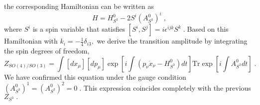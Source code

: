 \documentclass[12pt,a4paper]{article}
\begin{document}
the corresponding Hamiltonian can be written as%
\begin{equation}
H=H_{S^{3}}^{0}-2S^{i}(A_{S^{3}}^{0})^{i}\;,
\end{equation}
where $S^{i}$ is a spin variable that satisfies $[S^{i},S^{j}]=i\epsilon
^{ijk}S^{k}\;.\;$Based on this Hamiltonian with $k_{i}=-\frac{1}{4}\delta
_{i3},$ we derive the transition amplitude by integrating the spin degrees
of freedom\cite{Nielsen:1988sa}\cite{Kashiwa:1990pk}, 
\begin{equation}
Z_{SO(4)/SO(3)}=\int [dx_{\mu }][dp_{\mu }]\exp \left[ i\int \left( p_{\nu }%
\dot{x}_{\nu }-H_{S^{3}}^{0}\right) dt\right] \mathrm{Tr}\exp \left[ i\int
A_{S^{3}}^{0}dt\right] \;.
\end{equation}
We have confirmed this equation under the gauge condition $%
(A_{S^{3}}^{0})^{1}=(A_{S^{3}}^{0})^{2}=0\;.$ This expression coincides
completely with the previous $Z_{S^{3}}\;.$%

\end{document}
